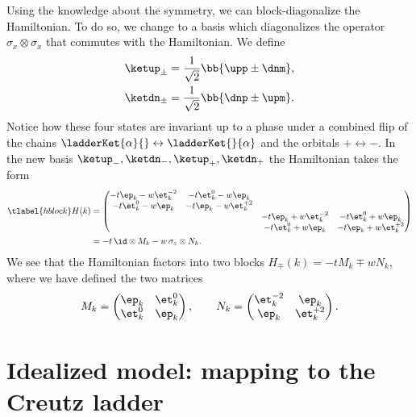 Using the knowledge about the symmetry, we can block-diagonalize the Hamiltonian. To do so, we change to a basis which diagonalizes the operator $\sigma_x \otimes \sigma_x$ that commutes with the Hamiltonian. We define
\begin{align}
    \ketup_\pm = \frac{1}{\sqrt{2}} \bb{ \upp \pm \dnm }, \\
    \ketdn_\pm = \frac{1}{\sqrt{2}} \bb{ \dnp \pm \upm }.
\end{align}
Notice how these four states are invariant up to a phase under a combined flip of the chains $\ladderKet{\alpha}{} \leftrightarrow \ladderKet{}{\alpha}$ and the orbitals $+ \leftrightarrow -$.
In the new basis $\ketup_-, \ketdn_-, \ketup_+, \ketdn_+$ the Hamiltonian takes the form
\begin{align} \tlabel{hblock}
    H(k) &=
    \begin{pmatrix}
        -t\ep_k -w\et_k^{-2} & -t\et_k^0 -w\ep_k &  &  \\
        -t\et^0_k - w\ep_k & -t \ep_k - w\et_k^{+2} &  &  \\
         &  & -t\ep_k +w\et_k^{-2} & -t\et_k^0 +w\ep_k \\
         &  & -t\et^0_k + w\ep_k & -t \ep_k + w\et_k^{+2}
    \end{pmatrix} \\
    &= - t \, \id \otimes M_k - w \, \sigma_z \otimes N_k.
\end{align}
We see that the Hamiltonian factors into two blocks $H_\mp(k) = -t M_k \mp w N_k$, where we have defined the two matrices
\begin{align}
    M_k = \begin{pmatrix}
        \ep_k & \et_k^0 \\
        \et_k^0 & \ep_k
    \end{pmatrix},\qquad
    N_k = \begin{pmatrix}
    \et_k^{-2} & \ep_k \\
    \ep_k & \et_k^{+2}
    \end{pmatrix}.
\end{align}

\section{Idealized model: mapping to the Creutz ladder}


